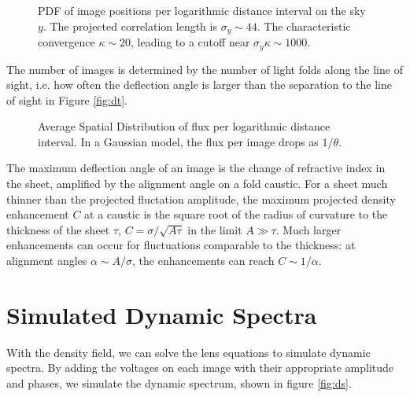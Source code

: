 \documentclass[useAMS,usenatbib]{mn2e}
\begin{document}
\begin{figure}
\centerline{}
\caption{PDF of image positions per logarithmic distance interval on
  the sky $y$.  The projected correlation length is $\sigma_y \sim
  44$.  The characteristic convergence $\kappa \sim 20$, leading to a
  cutoff near $\sigma_y \kappa \sim 1000$.
}
\label{fig:pos}
\end{figure}

The number of images is determined by the number of light folds along
the line of sight, i.e. how often the deflection angle is larger than
the separation to the line of sight in Figure \ref{fig:dt}.

\begin{figure}
\centerline{}
\caption{Average Spatial Distribution of flux per logarithmic distance
  interval.  In a Gaussian model, the flux per image drops as
  $1/\theta$. 
}
\label{fig:posmag}
\end{figure}

The maximum deflection angle of an image is the change of refractive
index in the sheet, amplified by the alignment angle on a fold
caustic.  For a sheet much thinner than the projected fluctation
amplitude, the maximum projected density enhancement $C$ at a caustic
is the square root of the radius of curvature to the thickness of the
sheet $\tau$, $C=\sigma/\sqrt{A\tau}$ in the limit $A \gg \tau$.
Much larger enhancements can occur for fluctuations comparable to the
thickness: at alignment angles $\alpha \sim A/\sigma$, the
enhancements can reach $C \sim 1/\alpha$.

\section{Simulated Dynamic Spectra}

With the density field, we can solve the lens equations to simulate
dynamic spectra.  By adding the voltages on each image  with their
appropriate amplitude and phases, we simulate the dynamic spectrum,
shown in figure \ref{fig:ds}.
\end{document}
